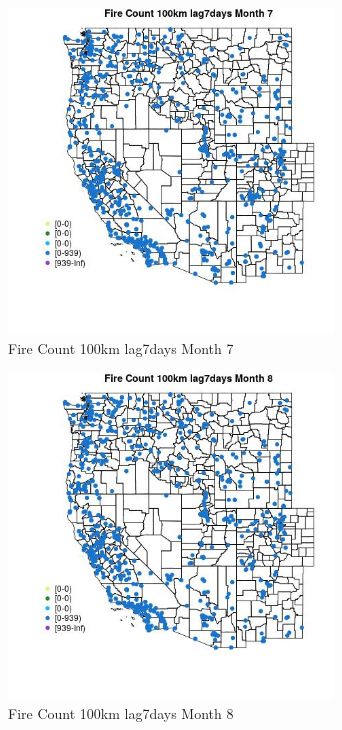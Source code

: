 \begin{figure} 
\centering  
\includegraphics[width=0.77\textwidth]{Code_Outputs/Report_ML_input_PM25_Step4_part_e_de_duplicated_aves_compiled_2019-05-21wNAs_MapObsMo7Fire_Count_100km_lag7days.jpg} 
\caption{\label{fig:Report_ML_input_PM25_Step4_part_e_de_duplicated_aves_compiled_2019-05-21wNAsMapObsMo7Fire_Count_100km_lag7days}Fire Count 100km lag7days Month 7} 
\end{figure} 
 

\clearpage 

\begin{figure} 
\centering  
\includegraphics[width=0.77\textwidth]{Code_Outputs/Report_ML_input_PM25_Step4_part_e_de_duplicated_aves_compiled_2019-05-21wNAs_MapObsMo8Fire_Count_100km_lag7days.jpg} 
\caption{\label{fig:Report_ML_input_PM25_Step4_part_e_de_duplicated_aves_compiled_2019-05-21wNAsMapObsMo8Fire_Count_100km_lag7days}Fire Count 100km lag7days Month 8} 
\end{figure} 
 

